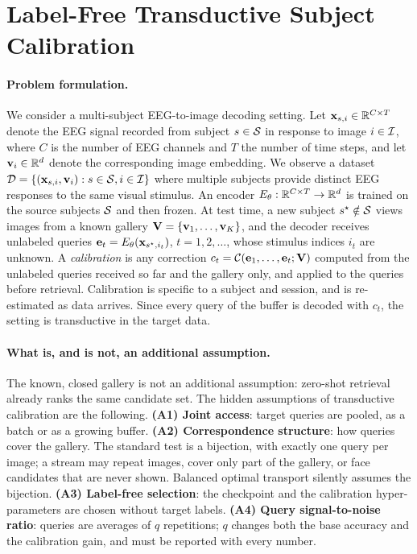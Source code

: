 \documentclass[10pt,twocolumn,letterpaper]{article}
\begin{document}
\section{Label-Free Transductive Subject Calibration}
\label{sec:setting}

\paragraph{Problem formulation.}
We consider a multi-subject EEG-to-image decoding setting. Let ${\bf x}_{s,i} \in {\mathbb R}^{C\times T}$ denote the EEG signal recorded from subject $s \in {\cal S}$ in response to image $i \in {\cal I}$, where $C$ is the number of EEG channels and $T$ the number of time steps, and let ${\bf v}_i \in {\mathbb R}^{d}$ denote the corresponding image embedding. We observe a dataset ${\cal D} = \{({\bf x}_{s,i}, {\bf v}_i): s\in {\cal S}, i \in {\cal I}\}$ where multiple subjects provide distinct EEG responses to the same visual stimulus. An encoder $E_\theta : {\mathbb R}^{C \times T} \to {\mathbb R}^d$ is trained on the source subjects ${\cal S}$ and then frozen. At test time, a new subject $s^\star \notin {\cal S}$ views images from a known gallery ${\bf V} = \{{\bf v}_1,\ldots,{\bf v}_K\}$, and the decoder receives unlabeled queries ${\bf e}_t = E_\theta({\bf x}_{s^\star,i_t})$, $t=1,2,\ldots$, whose stimulus indices $i_t$ are unknown. A \emph{calibration} is any correction $c_t = {\cal C}({\bf e}_1,\ldots,{\bf e}_t;{\bf V})$ computed from the unlabeled queries received so far and the gallery only, and applied to the queries before retrieval. Calibration is specific to a subject and session, and is re-estimated as data arrives. Since every query of the buffer is decoded with $c_t$, the setting is transductive in the target data.

\paragraph{What is, and is not, an additional assumption.}
The known, closed gallery is not an additional assumption: zero-shot retrieval already ranks the same candidate set. The hidden assumptions of transductive calibration are the following.
\textbf{(A1) Joint access}: target queries are pooled, as a batch or as a growing buffer.
\textbf{(A2) Correspondence structure}: how queries cover the gallery. The standard test is a bijection, with exactly one query per image; a stream may repeat images, cover only part of the gallery, or face candidates that are never shown. Balanced optimal transport silently assumes the bijection.
\textbf{(A3) Label-free selection}: the checkpoint and the calibration hyper-parameters are chosen without target labels.
\textbf{(A4) Query signal-to-noise ratio}: queries are averages of $q$ repetitions; $q$ changes both the base accuracy and the calibration gain, and must be reported with every number.
\end{document}
